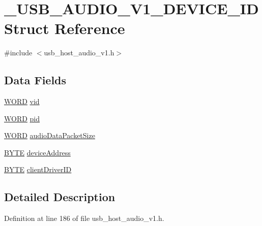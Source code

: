\hypertarget{struct___u_s_b___a_u_d_i_o___v1___d_e_v_i_c_e___i_d}{}\section{\+\_\+\+U\+S\+B\+\_\+\+A\+U\+D\+I\+O\+\_\+\+V1\+\_\+\+D\+E\+V\+I\+C\+E\+\_\+\+I\+D Struct Reference}
\label{struct___u_s_b___a_u_d_i_o___v1___d_e_v_i_c_e___i_d}


{\ttfamily \#include $<$usb\+\_\+host\+\_\+audio\+\_\+v1.\+h$>$}

\subsection*{Data Fields}
\begin{DoxyCompactItemize}
\item 
\hyperlink{_generic_type_defs_8h_a2b0e863dadf920709ec53d9088ee7c91}{W\+O\+R\+D} \hyperlink{struct___u_s_b___a_u_d_i_o___v1___d_e_v_i_c_e___i_d_a9fcc011b7b6427b55322964f2d01781f}{vid}
\item 
\hyperlink{_generic_type_defs_8h_a2b0e863dadf920709ec53d9088ee7c91}{W\+O\+R\+D} \hyperlink{struct___u_s_b___a_u_d_i_o___v1___d_e_v_i_c_e___i_d_a718a3b94d880d84d1532ae6411eb60cc}{pid}
\item 
\hyperlink{_generic_type_defs_8h_a2b0e863dadf920709ec53d9088ee7c91}{W\+O\+R\+D} \hyperlink{struct___u_s_b___a_u_d_i_o___v1___d_e_v_i_c_e___i_d_a1a51aa22d53fb4bef3393ce23f551a27}{audio\+Data\+Packet\+Size}
\item 
\hyperlink{_generic_type_defs_8h_a4ae1dab0fb4b072a66584546209e7d58}{B\+Y\+T\+E} \hyperlink{struct___u_s_b___a_u_d_i_o___v1___d_e_v_i_c_e___i_d_aa1d659071a17ee8d0172d34d6783b517}{device\+Address}
\item 
\hyperlink{_generic_type_defs_8h_a4ae1dab0fb4b072a66584546209e7d58}{B\+Y\+T\+E} \hyperlink{struct___u_s_b___a_u_d_i_o___v1___d_e_v_i_c_e___i_d_a343912ad63712ea60903f5acd92efc9e}{client\+Driver\+I\+D}
\end{DoxyCompactItemize}


\subsection{Detailed Description}


Definition at line 186 of file usb\+\_\+host\+\_\+audio\+\_\+v1.\+h.



